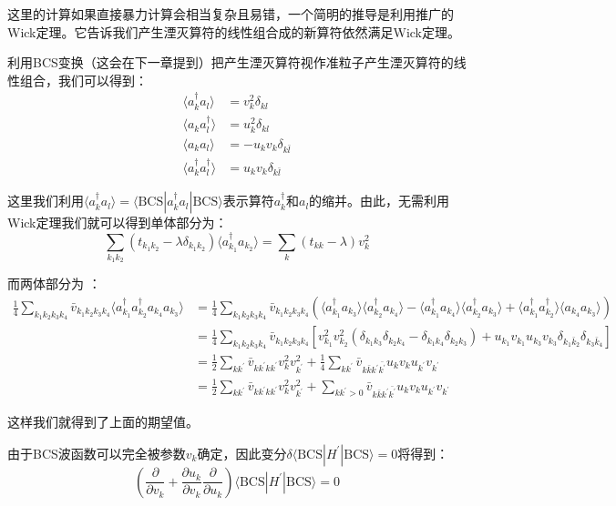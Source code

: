 \begin{booknote*}
这里的计算如果直接暴力计算会相当复杂且易错，一个简明的推导是利用推广的Wick定理。它告诉我们产生湮灭算符的线性组合成的新算符依然满足Wick定理。

利用BCS变换（这会在下一章提到）把产生湮灭算符视作准粒子产生湮灭算符的线性组合，我们可以得到：
\begin{align*}
\langle a^{\dagger}_{k}a_{l}\rangle & =v^{2}_{k}\delta_{kl}\\
\langle a_{k}a^{\dagger}_{l}\rangle & =u^{2}_{k}\delta_{kl}\\
\langle a_{k}a_{l}\rangle & =-u_{k}v_{k}\delta_{k\bar{l}}\\
\langle a^{\dagger}_{k}a^{\dagger}_{l}\rangle & =u_{k}v_{k}\delta_{k\bar{l}}
\end{align*}

这里我们利用$\langle a^{\dagger}_{k}a_{l}\rangle=\langle\text{BCS}|a^{\dagger}_{k}a_{l}|\text{BCS}\rangle$表示算符$a^{\dagger}_{k}$和$a_{l}$的缩并。由此，无需利用Wick定理我们就可以得到单体部分为：
\[
\sum_{k_{1}k_{2}}(t_{k_{1}k_{2}}-\lambda\delta_{k_{1}k_{2}})\langle a^{\dagger}_{k_{1}}a_{k_{2}}\rangle=\sum_{k}(t_{kk}-\lambda)v^{2}_{k}
\]

而两体部分为 ：
\begin{align*}
\frac{1}{4}\sum_{k_{1}k_{2}k_{3}k_{4}}\bar{v}_{k_{1}k_{2}k_{3}k_{4}}\langle a^{\dagger}_{k_{1}}a^{\dagger}_{k_{2}}a_{k_{4}}a_{k_{3}}\rangle & =\frac{1}{4}\sum_{k_{1}k_{2}k_{3}k_{4}}\bar{v}_{k_{1}k_{2}k_{3}k_{4}}\left(\langle a^{\dagger}_{k_{1}}a_{k_{3}}\rangle\langle a^{\dagger}_{k_{2}}a_{k_{4}}\rangle-\langle a^{\dagger}_{k_{1}}a_{k_{4}}\rangle\langle a^{\dagger}_{k_{2}}a_{k_{3}}\rangle+\langle a^{\dagger}_{k_{1}}a^{\dagger}_{k_{2}}\rangle\langle a_{k_{4}}a_{k_{3}}\rangle\right)\\
 & =\frac{1}{4}\sum_{k_{1}k_{2}k_{3}k_{4}}\bar{v}_{k_{1}k_{2}k_{3}k_{4}}\left[v^{2}_{k_{1}}v^{2}_{k_{2}}(\delta_{k_{1}k_{3}}\delta_{k_{2}k_{4}}-\delta_{k_{1}k_{4}}\delta_{k_{2}k_{3}})+u_{k_{1}}v_{k_{1}}u_{k_{3}}v_{k_{3}}\delta_{k_{1}\bar{k}_{2}}\delta_{k_{3}\bar{k}_{4}}\right]\\
 & =\frac{1}{2}\sum_{kk^{\prime}}\bar{v}_{kk^{\prime}kk^{\prime}}v^{2}_{k}v^{2}_{k^{\prime}}+\frac{1}{4}\sum_{kk^{\prime}}\bar{v}_{k\bar{k}k^{\prime}\bar{k^{\prime}}}u_{k}v_{k}u_{k^{\prime}}v_{k^{\prime}}\\
 & =\frac{1}{2}\sum_{kk^{\prime}}\bar{v}_{kk^{\prime}kk^{\prime}}v^{2}_{k}v^{2}_{k^{\prime}}+\sum_{kk^{\prime}>0}\bar{v}_{k\bar{k}k^{\prime}\bar{k^{\prime}}}u_{k}v_{k}u_{k^{\prime}}v_{k^{\prime}}
\end{align*}

这样我们就得到了上面的期望值。
\end{booknote*}
由于BCS波函数可以完全被参数$v_{k}$确定，因此变分$\delta\langle\text{BCS}|H^{\prime}|\text{BCS}\rangle=0$将得到：
\[
\left(\frac{\partial}{\partial v_{k}}+\frac{\partial u_{k}}{\partial v_{k}}\frac{\partial}{\partial u_{k}}\right)\langle\text{BCS}|H^{\prime}|\text{BCS}\rangle=0
\]

